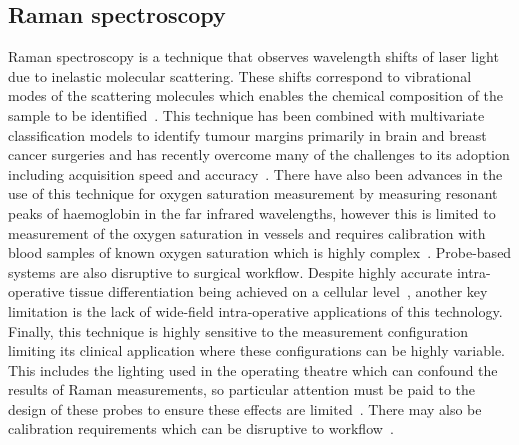 \subsection{Raman spectroscopy}
Raman spectroscopy is a technique that observes wavelength shifts of laser light due to inelastic molecular scattering. These shifts correspond to vibrational modes of the scattering molecules which enables the chemical composition of the sample to be identified~\citep{Kong2015}. This technique has been combined with multivariate classification models to identify tumour margins primarily in brain and breast cancer surgeries and has recently overcome many of the challenges to its adoption including acquisition speed and accuracy~\citep{Kong2015, Fitzgerald2022}. There have also been advances in the use of this technique for oxygen saturation measurement by measuring resonant peaks of haemoglobin in the far infrared wavelengths, however this is limited to measurement of the oxygen saturation in vessels and requires calibration with blood samples of known oxygen saturation which is highly complex~\citep{TorresFilho2016}. Probe-based systems are also disruptive to surgical workflow. Despite highly accurate intra-operative tissue differentiation being achieved on a cellular level~\citep{Fitzgerald2022}, another key limitation is the lack of wide-field intra-operative applications of this technology. Finally, this technique is highly sensitive to the measurement configuration limiting its clinical application where these configurations can be highly variable. This includes the lighting used in the operating theatre which can confound the results of Raman measurements, so particular attention must be paid to the design of these probes to ensure these effects are limited~\citep{Horsnell2016}. There may also be calibration requirements which can be disruptive to workflow~\citep{TorresFilho2016}.

